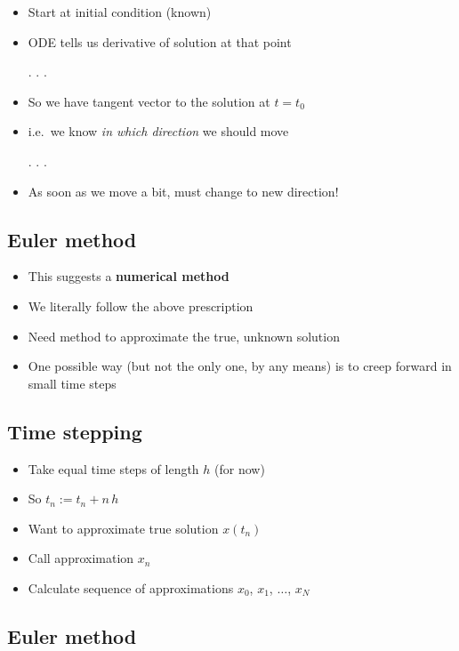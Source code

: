 \documentclass[
]{article}
\begin{document}
\begin{itemize}
\item
  Start at initial condition (known)
\item
  ODE tells us derivative of solution at that point

  . . .
\item
  So we have tangent vector to the solution at \(t=t_0\)
\item
  i.e.~we know \emph{in which direction} we should move

  . . .
\item
  As soon as we move a bit, must change to new direction!
\end{itemize}

\hypertarget{euler-method}{%
\subsection{Euler method}\label{euler-method}}

\begin{itemize}
\item
  This suggests a \textbf{numerical method}
\item
  We literally follow the above prescription
\item
  Need method to approximate the true, unknown solution
\item
  One possible way (but not the only one, by any means) is to creep
  forward in small time steps
\end{itemize}

\hypertarget{time-stepping}{%
\subsection{Time stepping}\label{time-stepping}}

\begin{itemize}
\item
  Take equal time steps of length \(h\) (for now)
\item
  So \(t_n := t_n + n \, h\)
\item
  Want to approximate true solution \(x(t_n)\)
\item
  Call approximation \(x_n\)
\item
  Calculate sequence of approximations \(x_0\), \(x_1\), \(\ldots\),
  \(x_N\)
\end{itemize}

\hypertarget{euler-method-1}{%
\subsection{Euler method}\label{euler-method-1}}
\end{document}
